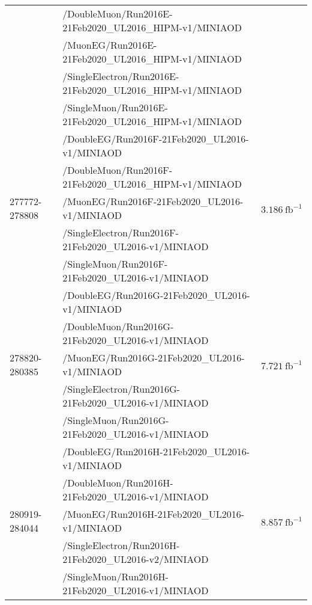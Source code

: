 \begin{table}[h]
\begin{tabular}{|l|l|l|}
		& /DoubleMuon/Run2016E-21Feb2020\_UL2016\_HIPM-v1/MINIAOD &  \\ 
		& /MuonEG/Run2016E-21Feb2020\_UL2016\_HIPM-v1/MINIAOD &  \\ 
          	& /SingleElectron/Run2016E-21Feb2020\_UL2016\_HIPM-v1/MINIAOD &  \\ 
		& /SingleMuon/Run2016E-21Feb2020\_UL2016\_HIPM-v1/MINIAOD &  \\ 
		\hline
		\multirow{5}{*}{277772-278808} & /DoubleEG/Run2016F-21Feb2020\_UL2016-v1/MINIAOD &  \multirow{5}{*}{$3.186\ \text{fb}^{-1}$} \\ 
		& /DoubleMuon/Run2016F-21Feb2020\_UL2016\_HIPM-v1/MINIAOD &  \\ 
		& /MuonEG/Run2016F-21Feb2020\_UL2016-v1/MINIAOD &  \\ 
		& /SingleElectron/Run2016F-21Feb2020\_UL2016-v1/MINIAOD &  \\ 
		& /SingleMuon/Run2016F-21Feb2020\_UL2016-v1/MINIAOD &  \\ 
		\hline
		\multirow{5}{*}{278820-280385} & /DoubleEG/Run2016G-21Feb2020\_UL2016-v1/MINIAOD &  \multirow{5}{*}{$7.721\ \text{fb}^{-1}$} \\ 
		& /DoubleMuon/Run2016G-21Feb2020\_UL2016-v1/MINIAOD &  \\ 
		& /MuonEG/Run2016G-21Feb2020\_UL2016-v1/MINIAOD &  \\ 
		& /SingleElectron/Run2016G-21Feb2020\_UL2016-v1/MINIAOD &  \\ 
		& /SingleMuon/Run2016G-21Feb2020\_UL2016-v1/MINIAOD &  \\ 
		\hline
		\multirow{5}{*}{280919-284044} & /DoubleEG/Run2016H-21Feb2020\_UL2016-v1/MINIAOD &  \multirow{5}{*}{$8.857\ \text{fb}^{-1}$} \\ 
		& /DoubleMuon/Run2016H-21Feb2020\_UL2016-v1/MINIAOD &  \\ 
		& /MuonEG/Run2016H-21Feb2020\_UL2016-v1/MINIAOD &  \\ 
		& /SingleElectron/Run2016H-21Feb2020\_UL2016-v2/MINIAOD &  \\ 
		& /SingleMuon/Run2016H-21Feb2020\_UL2016-v1/MINIAOD &  \\ 

\end{tabular}
\end{table}
